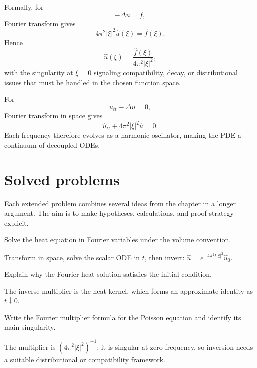 \begin{example}\label{ex:iii28-worked-03}
Formally, for
\[
-\Delta u=f,
\]
Fourier transform gives
\[
4\pi^2|\xi|^2\widehat u(\xi)=\widehat f(\xi).
\]
Hence
\[
\widehat u(\xi)=\frac{\widehat f(\xi)}{4\pi^2|\xi|^2},
\]
with the singularity at \(\xi=0\) signaling compatibility, decay, or
distributional issues that must be handled in the chosen function space.
\end{example}

\begin{example}\label{ex:iii28-worked-04}
For
\[
u_{tt}-\Delta u=0,
\]
Fourier transform in space gives
\[
\widehat u_{tt}+4\pi^2|\xi|^2\widehat u=0.
\]
Each frequency therefore evolves as a harmonic oscillator, making the PDE a
continuum of decoupled ODEs.
\end{example}

\section{Solved problems}
Each extended problem combines several ideas from the chapter in a longer argument. The aim is to make hypotheses, calculations, and proof strategy explicit.

\begin{problem}\label{prob:iii28-problem-01}
Solve the heat equation in Fourier variables under the volume convention.
\end{problem}
\begin{solution}
Transform in space, solve the scalar ODE in \(t\), then invert:
\(\widehat u=e^{-4\pi^2t|\xi|^2}\widehat u_0\).
\end{solution}

\begin{problem}\label{prob:iii28-problem-02}
Explain why the Fourier heat solution satisfies the initial condition.
\end{problem}
\begin{solution}
The inverse multiplier is the heat kernel, which forms an approximate
identity as \(t\downarrow0\).
\end{solution}

\begin{problem}\label{prob:iii28-problem-03}
Write the Fourier multiplier formula for the Poisson equation and identify its main singularity.
\end{problem}
\begin{solution}
The multiplier is \((4\pi^2|\xi|^2)^{-1}\); it is singular at zero
frequency, so inversion needs a suitable distributional or compatibility
framework.
\end{solution}

